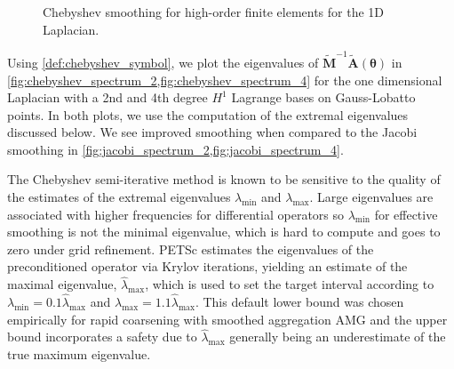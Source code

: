 \documentclass[review]{siamart190516}
\begin{document}
\begin{figure}[!tbp]
  \centering
  \hfill
  \caption{Chebyshev smoothing for high-order finite elements for the 1D Laplacian.}
\end{figure}

Using \cref{def:chebyshev_symbol}, we plot the eigenvalues of $\tilde{\mathbf{M}}^{-1} \tilde{\mathbf{A}} \left( \boldsymbol{\theta} \right)$ in \cref{fig:chebyshev_spectrum_2,fig:chebyshev_spectrum_4} for the one dimensional Laplacian with a 2nd and 4th degree $H^1$ Lagrange bases on Gauss-Lobatto points.
In both plots, we use the computation of the extremal eigenvalues discussed below.
We see improved smoothing when compared to the Jacobi smoothing in \cref{fig:jacobi_spectrum_2,fig:jacobi_spectrum_4}.

The Chebyshev semi-iterative method is known to be sensitive to the quality of the estimates of the extremal eigenvalues $\lambda_{\text{min}}$ and $\lambda_{\text{max}}$.
Large eigenvalues are associated with higher frequencies for differential operators so $\lambda_{\min}$ for effective smoothing is not the minimal eigenvalue, which is hard to compute and goes to zero under grid refinement.
PETSc \cite{petsc-user-ref} estimates the eigenvalues of the preconditioned operator via Krylov iterations, yielding an estimate of the maximal eigenvalue, $\hat{\lambda}_{\text{max}}$, which is used to set the target interval according to $\lambda_{\text{min}} = 0.1 \hat{\lambda}_{\text{max}}$ and $\lambda_{\text{max}} = 1.1 \hat{\lambda}_{\text{max}}$.
This default lower bound was chosen empirically for rapid coarsening with smoothed aggregation AMG and the upper bound incorporates a safety due to $\hat{\lambda}_{\max}$ generally being an underestimate of the true maximum eigenvalue.
\end{document}
